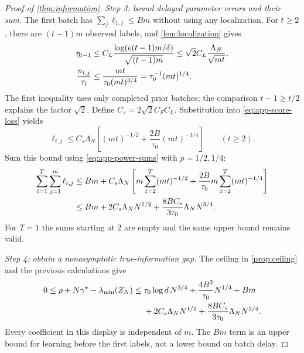 \documentclass[10pt,twoside,letterpaper]{article}
\begin{document}
\begin{proof}[Proof of \cref{thm:information}]
\textit{Step 3: bound delayed parameter errors and their sum.}
The first batch has $\sum_j\ell_{1,j}\le Bm$ without using any
localization. For $t\ge2$, there are $(t-1)m$ observed labels, and
\cref{lem:localization} gives
\begin{align}
\eta_{t-1}
&\le C_L\frac{\log(e(t-1)m/\delta)}{\sqrt{(t-1)m}}
\le\sqrt2C_L\frac{\Lambda_N}{\sqrt{mt}},\notag\\
\frac{n_{t,j}}{\tau_t}
&\le\frac{mt}{\tau_0(mt)^{3/4}}
=\tau_0^{-1}(mt)^{1/4}.
\label{eq:app-delayed-error-components}
\end{align}
The first inequality uses only completed prior batches; the comparison
$t-1\ge t/2$ explains the factor $\sqrt2$.
Define $C_s=2\sqrt2C_FC_L$. Substitution into
\eqref{eq:app-score-loss} yields
\begin{equation}
\ell_{t,j}\le C_s\Lambda_N
\left[(mt)^{-1/2}+\frac{2B}{\tau_0}(mt)^{-1/4}\right]
\qquad(t\ge2).
\label{eq:app-delayed-error}
\end{equation}
Sum this bound using \eqref{eq:app-power-sums} with $p=1/2,1/4$:
\begin{align}
\sum_{t=1}^T\sum_{j=1}^m\ell_{t,j}
&\le Bm+C_s\Lambda_N\left[
 m\sum_{t=2}^T(mt)^{-1/2}
 +\frac{2B}{\tau_0}m\sum_{t=2}^T(mt)^{-1/4}\right]\notag\\
&\le Bm+2C_s\Lambda_NN^{1/2}
 +\frac{8BC_s}{3\tau_0}\Lambda_NN^{3/4}.
\label{eq:app-total-plugin-loss}
\end{align}
For $T=1$ the sums starting at $2$ are empty and the same upper
bound remains valid.

\textit{Step 4: obtain a nonasymptotic true-information gap.}
The ceiling in \cref{prop:ceiling} and the previous calculations give
\begin{align}
0\le\rho+N\gamma^\star-\lambda_{\min}(Z_N)
\le{}&\tau_0\log d\,N^{3/4}
 +\frac{4B^2}{\tau_0}N^{1/4}+Bm\notag\\
&+2C_s\Lambda_NN^{1/2}
 +\frac{8BC_s}{3\tau_0}\Lambda_NN^{3/4}.
\label{eq:app-decomposed-gap}
\end{align}
Every coefficient in this display is independent of $m$.
The $Bm$ term is an upper bound for learning before the first labels,
not a lower bound on batch delay.


\end{proof}
\end{document}
